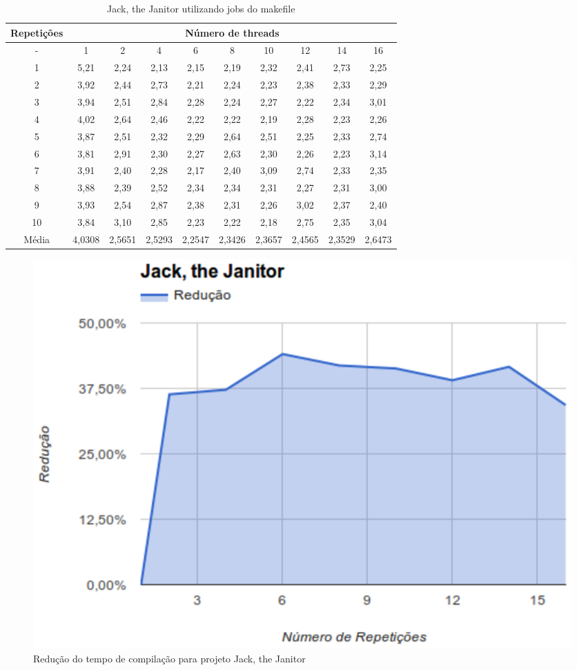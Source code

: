 \begin{table}[h]
\centering
\caption{Jack, the Janitor utilizando jobs do makefile}
\label{tab:jack}
\begin{tiny}
\begin{tabular}{cccccccccc}
\toprule
\textbf{Repetições} & \multicolumn{9}{c}{\textbf{Número de threads}} \\ \midrule
- & 1 & 2 & 4 & 6 & 8 & 10 & 12 & 14 & 16 \\ 
1 & 5,21    & 2,24  &  2,13   & 2,15   & 2,19   & 2,32   & 2,41  &  2,73  & 2,25 \\ \hline
2 & 3,92    & 2,44  &  2,73   & 2,21   & 2,24   & 2,23   & 2,38  &  2,33  & 2,29 \\ \hline
3 & 3,94    & 2,51  &  2,84   & 2,28   & 2,24   & 2,27   & 2,22  &  2,34  & 3,01 \\ \hline
4 & 4,02    & 2,64  &  2,46   & 2,22   & 2,22   & 2,19   & 2,28  &  2,23  & 2,26 \\ \hline
5 & 3,87    & 2,51  &  2,32   & 2,29   & 2,64   & 2,51   & 2,25  &  2,33  & 2,74 \\ \hline
6 & 3,81    & 2,91  &  2,30   & 2,27   & 2,63   & 2,30   & 2,26  &  2,23  & 3,14 \\ \hline
7 & 3,91    & 2,40  &  2,28   & 2,17   & 2,40   & 3,09   & 2,74  &  2,33  & 2,35 \\ \hline
8 & 3,88    & 2,39  &  2,52   & 2,34   & 2,34   & 2,31   & 2,27  &  2,31  & 3,00 \\ \hline
9 & 3,93    & 2,54  &  2,87   & 2,38   & 2,31   & 2,26   & 3,02  &  2,37  & 2,40 \\ \hline
10 & 3,84    & 3,10  &  2,85   & 2,23   & 2,22   & 2,18   & 2,75  &  2,35  & 3,04 \\ \hline
Média & 4,0308  & 2,5651&  2,5293 & 2,2547 & 2,3426 & 2,3657 & 2,4565&  2,3529 & 2,6473 \\ \hline
\end{tabular}
\end{tiny}
\end{table}
\begin{figure}[h]
    \centering
        \includegraphics[keepaspectratio=true,scale=1]{figuras/jack.eps}
    \caption{Redução do tempo de compilação para projeto Jack, the Janitor}
    \label{jack}
\end{figure}
